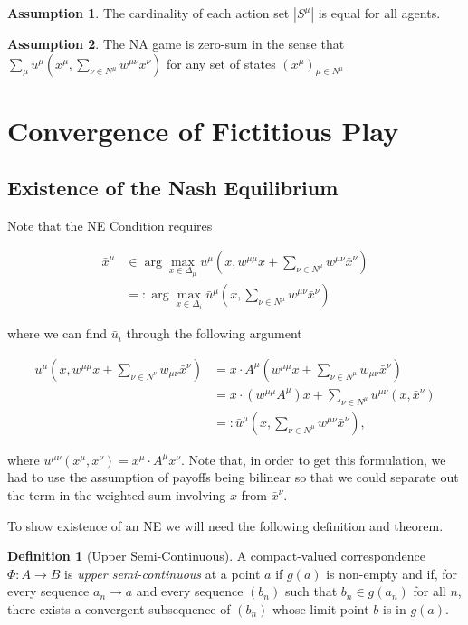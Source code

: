 \documentclass{article}
\theoremstyle{definition}
\newtheorem*{definition}{Definition}
\newtheorem{assumption}{Assumption}
\newcommand{\actionset}[1]{S^{#1}}
\newcommand{\wmunu}{w^{\mu \nu}}
\newcommand{\xmu}{x^{\mu}}
\newcommand{\xnu}{x^{\nu}}
\newcommand{\NE}[1]{\bar{x}^{#1}}
\newcommand{\weightedsum}{ \sum_{\nu \in N^\mu} \wmunu \xnu}
\begin{document}
	\begin{assumption}
		The cardinality of each action set $|\actionset{\mu}|$ is equal for all agents.
	\end{assumption}

	\begin{assumption}
		The NA game is zero-sum in the sense that $\sum_{\mu} u^\mu(\xmu, \weightedsum)$ for any set
		of states $(x^\mu)_{\mu \in N^\mu}$
	\end{assumption}

	\section{Convergence of Fictitious Play}

	\subsection{Existence of the Nash Equilibrium}
	
	Note that the NE Condition requires

	\begin{align}
		\NE{\mu} &\in \arg\max_{x \in \Delta_\mu} u^\mu(x, w^{\mu \mu}x + \sum_{\nu \in N^\mu} w^{\mu \nu} \NE{\nu}) \nonumber \\
		& =: \arg\max_{x \in \Delta_i} \bar{u}^\mu(x, \sum_{\nu \in N^\mu} w^{\mu \nu} \NE{\nu})
	\end{align}

	where we can find $\bar{u}_i$ through the following argument
	
	\begin{align}
		u^\mu(x, w^{\mu \mu} x + \sum_{\nu \in N^\nu} w_{\mu \nu} \NE{\nu}) & = x \cdot A^\mu (w^{\mu \mu} x + \sum_{\nu \in N^\mu} w_{\mu \nu} \NE{\nu}) \\
		 & = x \cdot (w^{\mu \mu} A^\mu)  x + \sum_{\nu \in N^\mu} u^{\mu \nu}(x, \NE{\nu}) \\
		 & =: \bar{u}^\mu(x, \sum_{\nu \in N^\mu} w^{\mu \nu} \NE{\nu}), \nonumber
	\end{align}
	
	where $u^{\mu \nu}(\xmu, x^\nu) = \xmu \cdot A^\mu x^\nu$. Note that, in order to get this
	formulation, we had to use the assumption of payoffs being bilinear so that we could separate
	out the term in the weighted sum involving $x$ from $\bar{x}^\nu$. 
	
	To show existence of an NE we will need the following definition and theorem.

	\begin{definition}[Upper Semi-Continuous]
		A compact-valued correspondence $\Phi: A \rightarrow B$ is \emph{upper semi-continuous} at a point $a$ if $g(a)$ is non-empty and if, for every sequence $a_n \rightarrow a$ and every sequence $(b_n)$ such that $b_n \in g(a_n)$ for all $n$, there exists a convergent subsequence of $(b_n)$ whose limit point $b$ is in $g(a)$.  
	\end{definition}
\end{document}

